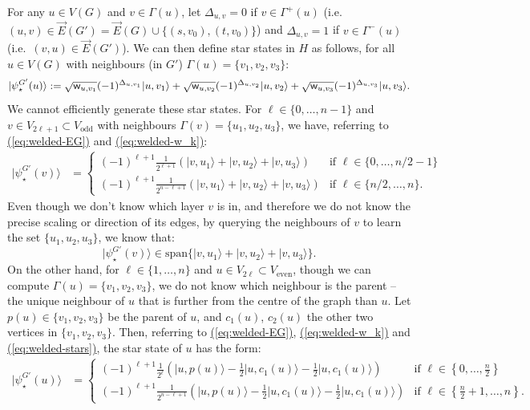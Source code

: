 \documentclass{theoretics}
\newcommand{\eq}[1]{\hyperref[eq:#1]{(\ref*{eq:#1})}}
\def\ket#1{{\lvert}#1\rangle}
\renewcommand{\>}{\rangle}
\newcommand{\<}{\langle}
\renewcommand{\(}{\left(}
\renewcommand{\)}{\right)}
\def\w{{\sf w}}
\begin{document}
For any $u\in V(G)$ and $v\in \Gamma(u)$, let $\Delta_{u,v}=0$ if $v\in\Gamma^+(u)$ (i.e.~$(u,v)\in\overrightarrow{E}(G')=\overrightarrow{E}(G)\cup\{(s,v_0),(t,v_0)\}$) and $\Delta_{u,v}=1$ if $v\in\Gamma^-(u)$ (i.e.~$(v,u)\in\overrightarrow{E}(G')$). 
We can then define star states in $H$ as follows, for all $u\in V(G)$ with neighbours (in $G'$) $\Gamma(u)=\{v_1,v_2,v_3\}$:  
\begin{equation}
\ket{\psi_\star^{G'}(u)} := \sqrt{\w_{u,v_1}}(-1)^{\Delta_{u,v_1}}\ket{u,v_1}+\sqrt{\w_{u,v_2}}(-1)^{\Delta_{u,v_2}}\ket{u,v_2}+\sqrt{\w_{u,v_3}}(-1)^{\Delta_{u,v_3}}\ket{u,v_3}.\label{eq:welded-stars}
\end{equation}
We cannot efficiently generate these star states. For $\ell\in \{0,\dots,n-1\}$ and $v\in V_{2\ell+1}\subset V_{\mathrm{odd}}$ with neighbours $\Gamma(v)=\{u_1,u_2,u_3\}$, we have, referring to \eq{welded-EG} and \eq{welded-w_k}:
\begin{equation}
\begin{split}
\ket{\psi_\star^{G'}(v)} &= \left\{\begin{array}{ll}
(-1)^{\ell+1}\frac{1}{2^{\ell+1}}\left(\ket{v,u_1}+\ket{v,u_2}+\ket{v,u_3} \right) & \mbox{if }\ell\in\{0,\dots,n/2-1\}\\
(-1)^{\ell+1}\frac{1}{2^{n-\ell+1}}\left(\ket{v,u_1}+\ket{v,u_2}+\ket{v,u_3} \right) & \mbox{if }\ell\in \{n/2,\dots,n\}.
\end{array}\right.
\end{split}\label{eq:welded-stars-B}
\end{equation}
Even though we don't know which layer $v$ is in, and therefore we do not know the precise scaling or direction of its edges, by querying the neighbours of $v$ to learn the set $\{u_1,u_2,u_3\}$, we know that:
$$\ket{\psi_\star^{G'}(v)}\in\mathrm{span}\{\ket{v,u_1}+\ket{v,u_2}+\ket{v,u_3}\}.$$
On the other hand, for $\ell\in\{1,\dots,n\}$ and $u\in V_{2\ell}\subset V_{\mathrm{even}}$, though we can compute $\Gamma(u)=\{v_1,v_2,v_3\}$, we do not know which neighbour is the parent -- the unique neighbour of $u$ that is further from the centre of the graph than $u$. Let $p(u)\in\{v_1,v_2,v_3\}$ be the parent of $u$, and $c_1(u)$, $c_2(u)$ the other two vertices in $\{v_1,v_2,v_3\}$. Then, referring to \eq{welded-EG}, \eq{welded-w_k} and \eq{welded-stars}, the star state of $u$ has the form:
\begin{align*}
\ket{\psi_\star^{G'}(u)}
&=\left\{\begin{array}{ll}
(-1)^{\ell+1}\frac{1}{2^{\ell}}\left(\ket{u,p(u)}-\frac{1}{2}\ket{u,c_1(u)}-\frac{1}{2}\ket{u,c_1(u)}\right) & \mbox{if }\ell\in\left\{0,\dots,\frac{n}{2}\right\}\\
 (-1)^{\ell+1}\frac{1}{2^{n-\ell+1}}\left(\ket{u,p(u)}-\frac{1}{2}\ket{u,c_1(u)}-\frac{1}{2}\ket{u,c_1(u)}\right)& \mbox{if }\ell\in\left\{\frac{n}{2}+1,\dots,n\right\}.
\end{array}\right.
\end{align*}
\end{document}
